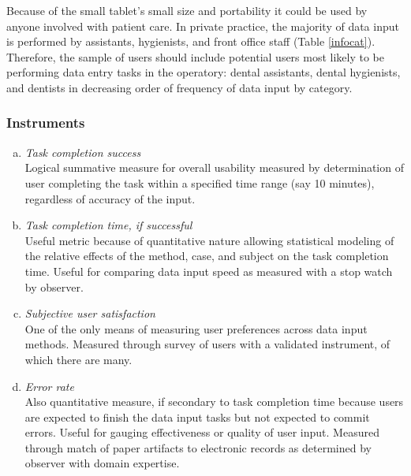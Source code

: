\documentclass[11pt]{article}
\begin{document}
Because of the small tablet's small size and portability it could be used by anyone involved with patient care. In private practice, the majority of data input is performed by assistants, hygienists, and front office staff (Table \ref{infocat}). Therefore, the sample of users should include potential users most likely to be performing data entry tasks in the operatory: dental assistants, dental hygienists, and dentists in decreasing order of frequency of data input by category. 

\subsubsection{Instruments}

\begin{enumerate}[(a)]
\item{\textit{Task completion success}}\\
Logical summative measure for overall usability measured by determination of user completing the task within a specified time range (say 10 minutes), regardless of accuracy of the input.

\item{\textit{Task completion time, if successful}}\\
Useful metric because of quantitative nature allowing statistical modeling of the relative effects of the method, case, and subject on the task completion time. Useful for comparing data input speed as measured with a stop watch by observer.

\item{\textit{Subjective user satisfaction}}\\
One of the only means of measuring user preferences across data input methods. Measured through survey of users with a validated instrument, of which there are many\cite{Chin1998Development-of-, Sittig1999Evaluating-phys, Wixom:2005fk, Han:2004uq,Kettinger:1994vn,Aladwani:2002kx}.

\item{\textit{Error rate}}\\
Also quantitative measure, if secondary to task completion time because users are expected to finish the data input tasks but not expected to commit errors. Useful for gauging effectiveness or quality of user input. Measured through match of paper artifacts to electronic records as determined by observer with domain expertise.
\end{enumerate}
\end{document}
